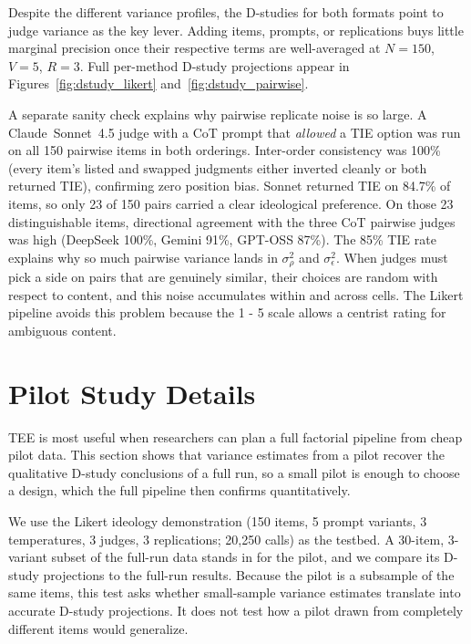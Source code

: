 Despite the different variance profiles, the D-studies for both formats point to judge variance as the key lever. %
Adding items, prompts, or replications buys little marginal precision once their respective terms are well-averaged at $N = 150$, $V = 5$, $R = 3$. Full per-method D-study projections appear in Figures~\ref{fig:dstudy_likert} and~\ref{fig:dstudy_pairwise}.

A separate sanity check explains why pairwise replicate noise is so large. A Claude~Sonnet~4.5 judge with a CoT prompt that \emph{allowed} a TIE option was run on all 150 pairwise items in both orderings. Inter-order consistency was 100\% (every item's listed and swapped judgments either inverted cleanly or both returned TIE), confirming zero position bias. Sonnet returned TIE on 84.7\% of items, so only 23 of 150 pairs carried a clear ideological preference. On those 23 distinguishable items, directional agreement with the three CoT pairwise judges was high (DeepSeek 100\%, Gemini 91\%, GPT-OSS 87\%). The 85\% TIE rate explains why so much pairwise variance lands in $\sigma^2_\rho$ and $\sigma^2_\epsilon$. When judges must pick a side on pairs that are genuinely similar, their choices are random with respect to content, and this noise accumulates within and across cells. The Likert pipeline avoids this problem because the 1 - 5 scale allows a centrist rating for ambiguous content.



\clearpage

\section{Pilot Study Details}
\label{si:pilot}

TEE is most useful when researchers can plan a full factorial pipeline from cheap pilot data. This section shows that variance estimates from a pilot recover the qualitative D-study conclusions of a full run, so a small pilot is enough to choose a design, which the full pipeline then confirms quantitatively.

We use the Likert ideology demonstration (150 items, 5 prompt variants, 3 temperatures, 3 judges, 3 replications; 20,250 calls) as the testbed. A 30-item, 3-variant subset of the full-run data stands in for the pilot, and we compare its D-study projections to the full-run results. Because the pilot is a subsample of the same items, this test asks whether small-sample variance estimates translate into accurate D-study projections. It does not test how a pilot drawn from completely different items would generalize.

